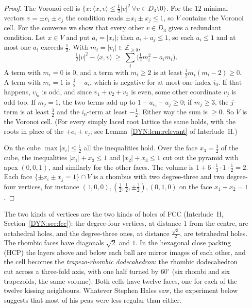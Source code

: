\documentclass[11pt,openany]{book}
\theoremstyle{plain}
\theoremstyle{definition}
\theoremstyle{remark}
\newcommand{\Z}{\mathbb{Z}}
\newcommand{\abs}[1]{\left\lvert #1 \right\rvert}
\newcommand{\ip}[2]{\langle #1, #2\rangle}
\begin{document}
\begin{proof}
The Voronoi cell is $\{x:\ip xv\le\frac12\abs v^2\ \forall v\in D_3\setminus0\}$. For the $12$ minimal
vectors $v=\pm e_i\pm e_j$ the condition reads $\pm x_i\pm x_j\le1$, so $V$ contains the Voronoi cell. For
the converse we show that every other $v\in D_3$ gives a redundant condition. Let $x\in V$ and put
$a_i=\abs{x_i}$; then $a_i+a_j\le1$, so each $a_i\le1$ and at most one $a_i$ exceeds $\frac12$. With
$m_i=\abs{v_i}\in\Z_{\ge0}$,
\[
  \tfrac12\abs v^2-\ip xv\ \ge\ \sum_i\Big(\tfrac12m_i^2-a_im_i\Big).
\]
A term with $m_i=0$ is $0$, and a term with $m_i\ge2$ is at least $\frac12m_i(m_i-2)\ge0$. A term with
$m_i=1$ is $\frac12-a_i$, which is negative for at most one index $i_0$. If that happens, $v_{i_0}$ is odd,
and since $v_1+v_2+v_3$ is even, some other coordinate $v_j$ is odd too. If $m_j=1$, the two terms add up
to $1-a_{i_0}-a_j\ge0$; if $m_j\ge3$, the $j$-term is at least $\frac32$ and the $i_0$-term at least
$-\frac12$. Either way the sum is $\ge0$. So $V$ is the Voronoi cell. (For every simply laced root lattice
the same holds, with the roots in place of the $\pm e_i\pm e_j$; see Lemma~\ref{DYN:lem:relevant} of
Interlude~H.)

On the cube $\max\abs{x_i}\le\frac12$ all the inequalities hold. Over the face $x_3=\frac12$ of the cube,
the inequalities $\abs{x_1}+x_3\le1$ and $\abs{x_2}+x_3\le1$ cut out the pyramid with apex $(0,0,1)$, and
similarly for the other faces. The volume is $1+6\cdot\frac13\cdot1\cdot\frac12=2$. Each face
$\{\pm x_i\pm x_j=1\}\cap V$ is a rhombus with two degree-three and two degree-four vertices, for instance
$(1,0,0),(\frac12,\frac12,\pm\frac12),(0,1,0)$ on the face $x_1+x_2=1$.
\end{proof}

The two kinds of vertices are the two kinds of holes of FCC (Interlude~H, Section~\ref{DYN:sec:fcc}): the
degree-four vertices, at distance $1$ from the centre, are octahedral holes, and the degree-three ones,
at distance $\frac{\sqrt3}{2}$, are tetrahedral holes. The rhombic faces have diagonals $\sqrt2$ and $1$.
In the hexagonal close packing (HCP) the layers above and below each ball are mirror images of each
other, and the cell becomes the \emph{trapezo-rhombic dodecahedron}: the rhombic dodecahedron cut across a
three-fold axis, with one half turned by $60^\circ$ (six rhombi and six trapezoids, the same volume). Both
cells have twelve faces, one for each of the twelve kissing neighbours. Whatever Stephen Hales saw, the
experiment below suggests that most of his peas were less regular than either.
\end{document}
